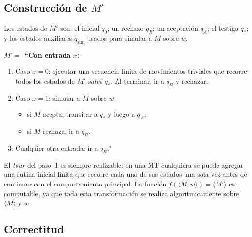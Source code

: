 \documentclass[11pt,a4paper]{article}
\theoremstyle{plain}
\theoremstyle{definition}
\theoremstyle{remark}
\newcommand{\enc}[1]{\langle #1\rangle}
\newcommand{\encMw}{\langle M, w\rangle}
\begin{document}
\subsection*{Construcci\'on de $M'$}

Los estados de $M'$ son: el inicial $q_0$; un rechazo $q_R$; un aceptaci\'on
$q_A$; el testigo $q_*$; y los estados auxiliares $q_{\text{sim}}$ usados
para simular a $M$ sobre $w$.

\medskip\noindent\textbf{$M'=$ ``Con entrada $x$:}
\begin{enumerate}
  \item Caso $x=0$: ejecutar una secuencia finita de movimientos triviales
        que recorre todos los estados de $M'$ \emph{salvo} $q_*$. Al
        terminar, ir a $q_R$ y rechazar.
  \item Caso $x=1$: simular a $M$ sobre $w$:
        \begin{itemize}
          \item si $M$ acepta, transitar a $q_*$ y luego a $q_A$;
          \item si $M$ rechaza, ir a $q_R$.
        \end{itemize}
  \item Cualquier otra entrada: ir a $q_R$.''
\end{enumerate}
\medskip

El \emph{tour} del paso~1 es siempre realizable: en una MT cualquiera se
puede agregar una rutina inicial finita que recorre cada uno de sus estados
una sola vez antes de continuar con el comportamiento principal.
La funci\'on $f(\encMw)=\enc{M'}$ es computable, ya que toda esta
transformaci\'on se realiza algor\'itmicamente sobre $\enc{M}$ y $w$.

\subsection*{Correctitud}
\end{document}
